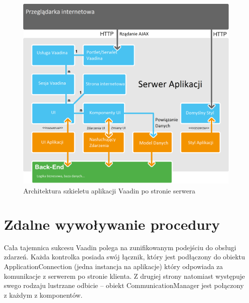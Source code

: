 \begin{figure} [H]
    \begin{center}
	\includegraphics[scale=.3]{img/serverSide.png}
	\caption{Architektura szkieletu aplikacji Vaadin po stronie serwera}
	\label{serverVaadin}
    \end{center}
\end{figure}

\section{Zdalne wywoływanie procedury}
Cała tajemnica sukcesu Vaadin polega na zunifikowanym podejściu do obsługi zdarzeń. Każda kontrolka posiada swój łącznik, który jest podłączony do obiektu ApplicationConnection (jedna instancja na aplikacje) który odpowiada za komunikacje z serwerem po stronie klienta. Z drugiej strony natomiast występuje swego
rodzaju lustrzane odbicie – obiekt CommunicationManager jest połączony z każdym z komponentów. 

